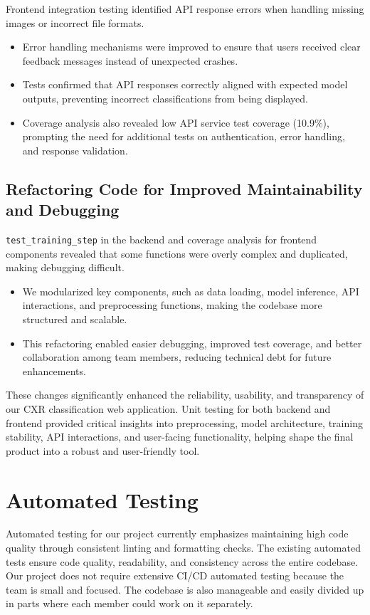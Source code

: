 \documentclass[12pt, titlepage]{article}
\begin{document}
Frontend integration testing identified API response errors when handling missing images or incorrect file formats.
\begin{itemize}
    \item Error handling mechanisms were improved to ensure that users received clear feedback messages instead of unexpected crashes.
    \item Tests confirmed that API responses correctly aligned with expected model outputs, preventing incorrect classifications from being displayed.
    \item Coverage analysis also revealed low API service test coverage (10.9\%), prompting the need for additional tests on authentication, error handling, and response validation.
\end{itemize}

\subsection{Refactoring Code for Improved Maintainability and Debugging}

\texttt{test\_training\_step} in the backend and coverage analysis for frontend components revealed that some functions were overly complex and duplicated, making debugging difficult.
\begin{itemize}
    \item We modularized key components, such as data loading, model inference, API interactions, and preprocessing functions, making the codebase more structured and scalable.
    \item This refactoring enabled easier debugging, improved test coverage, and better collaboration among team members, reducing technical debt for future enhancements.
\end{itemize}

These changes significantly enhanced the reliability, usability, and transparency of our CXR classification web application. Unit testing for both backend and frontend provided critical insights into preprocessing, model architecture, training stability, API interactions, and user-facing functionality, helping shape the final product into a robust and user-friendly tool.


\section{Automated Testing}
Automated testing for our project currently emphasizes maintaining high code quality through consistent linting and formatting checks. The existing automated tests ensure code quality, readability, and consistency across the entire codebase. Our project does not require extensive CI/CD automated testing because the team is small and focused. The codebase is also manageable and easily divided up in parts where each member could work on it separately.
\end{document}

